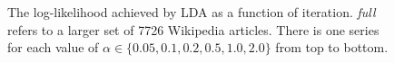\begin{figure}
%
%

\caption{The log-likelihood achieved by LDA as a function of iteration.  \emph{full} refers to a larger set of 7726 Wikipedia articles.   There is one series for each value of $\alpha \in \{0.05, 0.1, 0.2, 0.5, 1.0, 2.0\}$ from top to bottom.}
\label{fig:ll}
\end{figure}

